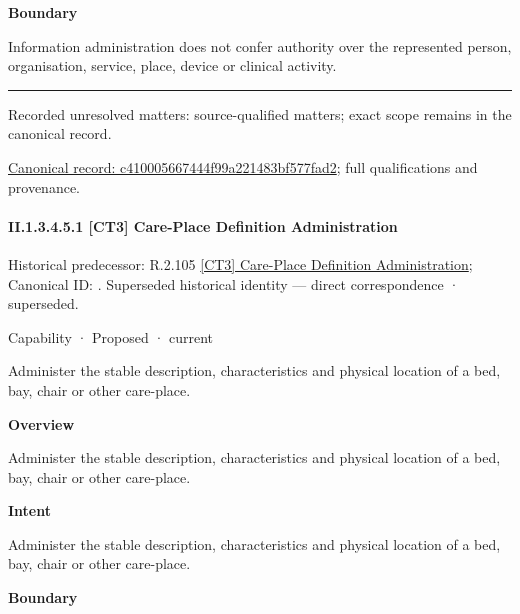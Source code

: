 \textbf{Boundary}



Information administration does not confer authority over the represented person, organisation, service, place, device or clinical activity.



\medskip\hrule\medskip

{\small Recorded unresolved matters: source-qualified matters; exact scope remains in the canonical record.}\par
{\footnotesize \href{../../../../../../../continuum/strategy/capability/c410005667444f99a221483bf577fad2.md}{Canonical record: c410005667444f99a221483bf577fad2}; full qualifications and provenance.}\par
\paragraph*{II.1.3.4.5.1 [CT3] Care-Place Definition Administration}
\label{navigation:II.1.3.4.5.1}

{\small Historical predecessor: R.2.105 \hyperref[element:a3464bd9c0dc4a01b50803acc7705b4e]{[CT3] Care-Place Definition Administration}; Canonical ID: \texttt{}. Superseded historical identity — direct correspondence · superseded.}\par
\label{element:629b493c7d9844baa25c029a87ed04f6}
{\small Capability · Proposed · current}\par

Administer the stable description, characteristics and physical location of a bed, bay, chair or other care-place.



\textbf{Overview}



Administer the stable description, characteristics and physical location of a bed, bay, chair or other care-place.



\textbf{Intent}



Administer the stable description, characteristics and physical location of a bed, bay, chair or other care-place.



\textbf{Boundary}



